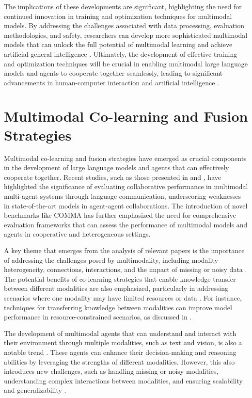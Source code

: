 \documentclass[conference]{IEEEtran}
\begin{document}
The implications of these developments are significant, highlighting the need for continued innovation in training and optimization techniques for multimodal models. By addressing the challenges associated with data processing, evaluation methodologies, and safety, researchers can develop more sophisticated multimodal models that can unlock the full potential of multimodal learning and achieve artificial general intelligence \cite{b13}. Ultimately, the development of effective training and optimization techniques will be crucial in enabling multimodal large language models and agents to cooperate together seamlessly, leading to significant advancements in human-computer interaction and artificial intelligence \cite{b14}.

\section{Multimodal Co-learning and Fusion Strategies}
Multimodal co-learning and fusion strategies have emerged as crucial components in the development of large language models and agents that can effectively cooperate together. Recent studies, such as those presented in \cite{b1} and \cite{b2}, have highlighted the significance of evaluating collaborative performance in multimodal multi-agent systems through language communication, underscoring weaknesses in state-of-the-art models in agent-agent collaborations. The introduction of novel benchmarks like COMMA \cite{b3} has further emphasized the need for comprehensive evaluation frameworks that can assess the performance of multimodal models and agents in cooperative and heterogeneous settings.

A key theme that emerges from the analysis of relevant papers is the importance of addressing the challenges posed by multimodality, including modality heterogeneity, connections, interactions, and the impact of missing or noisy data \cite{b4}. The potential benefits of co-learning strategies that enable knowledge transfer between different modalities are also emphasized, particularly in addressing scenarios where one modality may have limited resources or data \cite{b5}. For instance, techniques for transferring knowledge between modalities can improve model performance in resource-constrained scenarios, as discussed in \cite{b6}.

The development of multimodal agents that can understand and interact with their environment through multiple modalities, such as text and vision, is also a notable trend \cite{b7}. These agents can enhance their decision-making and reasoning abilities by leveraging the strengths of different modalities. However, this also introduces new challenges, such as handling missing or noisy modalities, understanding complex interactions between modalities, and ensuring scalability and generalizability \cite{b8}.
\end{document}
